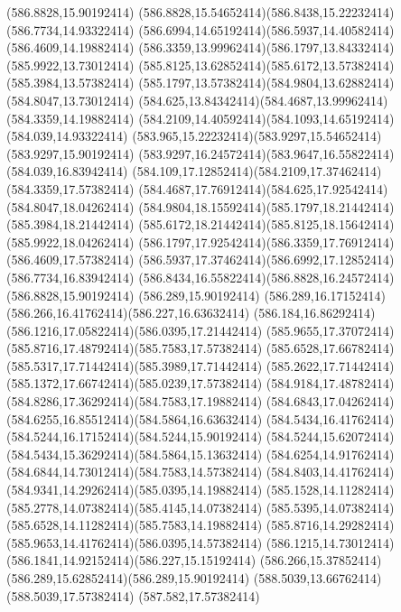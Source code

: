 {{	\closepath
	\moveto(586.8828,15.90192414)
	\curveto(586.8828,15.54652414)(586.8438,15.22232414)(586.7734,14.93322414)
	\curveto(586.6994,14.65192414)(586.5937,14.40582414)(586.4609,14.19882414)
	\curveto(586.3359,13.99962414)(586.1797,13.84332414)(585.9922,13.73012414)
	\curveto(585.8125,13.62852414)(585.6172,13.57382414)(585.3984,13.57382414)
	\curveto(585.1797,13.57382414)(584.9804,13.62882414)(584.8047,13.73012414)
	\curveto(584.625,13.84342414)(584.4687,13.99962414)(584.3359,14.19882414)
	\curveto(584.2109,14.40592414)(584.1093,14.65192414)(584.039,14.93322414)
	\curveto(583.965,15.22232414)(583.9297,15.54652414)(583.9297,15.90192414)
	\curveto(583.9297,16.24572414)(583.9647,16.55822414)(584.039,16.83942414)
	\curveto(584.109,17.12852414)(584.2109,17.37462414)(584.3359,17.57382414)
	\curveto(584.4687,17.76912414)(584.625,17.92542414)(584.8047,18.04262414)
	\curveto(584.9804,18.15592414)(585.1797,18.21442414)(585.3984,18.21442414)
	\curveto(585.6172,18.21442414)(585.8125,18.15642414)(585.9922,18.04262414)
	\curveto(586.1797,17.92542414)(586.3359,17.76912414)(586.4609,17.57382414)
	\curveto(586.5937,17.37462414)(586.6992,17.12852414)(586.7734,16.83942414)
	\curveto(586.8434,16.55822414)(586.8828,16.24572414)(586.8828,15.90192414)
	\closepath
	\moveto(586.289,15.90192414)
	\curveto(586.289,16.17152414)(586.266,16.41762414)(586.227,16.63632414)
	\curveto(586.184,16.86292414)(586.1216,17.05822414)(586.0395,17.21442414)
	\curveto(585.9655,17.37072414)(585.8716,17.48792414)(585.7583,17.57382414)
	\curveto(585.6528,17.66782414)(585.5317,17.71442414)(585.3989,17.71442414)
	\curveto(585.2622,17.71442414)(585.1372,17.66742414)(585.0239,17.57382414)
	\curveto(584.9184,17.48782414)(584.8286,17.36292414)(584.7583,17.19882414)
	\curveto(584.6843,17.04262414)(584.6255,16.85512414)(584.5864,16.63632414)
	\curveto(584.5434,16.41762414)(584.5244,16.17152414)(584.5244,15.90192414)
	\curveto(584.5244,15.62072414)(584.5434,15.36292414)(584.5864,15.13632414)
	\curveto(584.6254,14.91762414)(584.6844,14.73012414)(584.7583,14.57382414)
	\curveto(584.8403,14.41762414)(584.9341,14.29262414)(585.0395,14.19882414)
	\curveto(585.1528,14.11282414)(585.2778,14.07382414)(585.4145,14.07382414)
	\curveto(585.5395,14.07382414)(585.6528,14.11282414)(585.7583,14.19882414)
	\curveto(585.8716,14.29282414)(585.9653,14.41762414)(586.0395,14.57382414)
	\curveto(586.1215,14.73012414)(586.1841,14.92152414)(586.227,15.15192414)
	\curveto(586.266,15.37852414)(586.289,15.62852414)(586.289,15.90192414)
	\closepath
	\moveto(588.5039,13.66762414)
	\lineto(588.5039,17.57382414)
	\lineto(587.582,17.57382414)
}}
